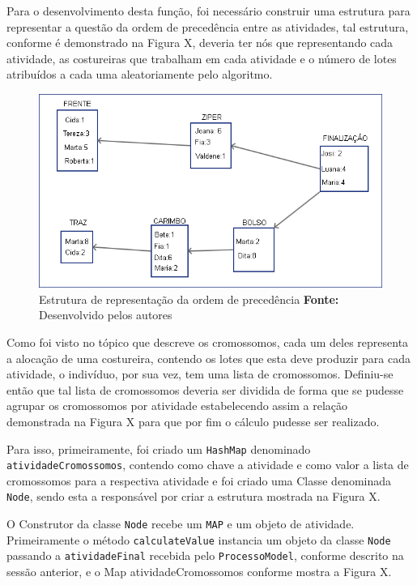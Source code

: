 \par Para o desenvolvimento desta função, foi necessário construir uma estrutura para representar a questão da ordem de precedência entre as atividades, tal estrutura, conforme é demonstrado na Figura X, deveria ter nós que representando cada atividade, as costureiras que 
trabalham em cada atividade e o número de lotes atribuídos a cada uma aleatoriamente pelo algoritmo.

\newpage

\begin{figure}[h!]
	\centerline{\includegraphics[scale=0.6]{./imagens/montagem_node.png}}
	\caption[Distribuição de trabalho]
	{Estrutura de representação da ordem de precedência \textbf{Fonte:} Desenvolvido pelos autores}
	\label{fig:exemplo1}
\end{figure}


\par Como foi visto no tópico que descreve os cromossomos, cada um deles representa a alocação de uma costureira, contendo os lotes
que esta deve produzir para cada atividade, o indivíduo, por sua vez, tem uma lista de cromossomos. Definiu-se então
que tal lista de cromossomos deveria ser dividida de forma que se pudesse agrupar os cromossomos por atividade estabelecendo assim a
relação demonstrada na Figura X para que por fim o cálculo pudesse ser realizado.

\par Para isso, primeiramente, foi criado um \texttt{HashMap} denominado \texttt{atividadeCromossomos}, contendo como chave a atividade e como valor a lista de cromossomos para a respectiva atividade e foi criado uma Classe denominada \texttt{Node}, sendo esta a responsável por criar a estrutura mostrada na Figura X.

\par O Construtor da classe \texttt{Node} recebe um \texttt{MAP} e um objeto de atividade. Primeiramente o método \texttt{calculateValue} instancia um objeto da classe \texttt{Node} passando a \texttt{atividadeFinal} recebida pelo \texttt{ProcessoModel}, conforme descrito na sessão anterior, e o Map atividadeCromossomos conforme
mostra a Figura X.

